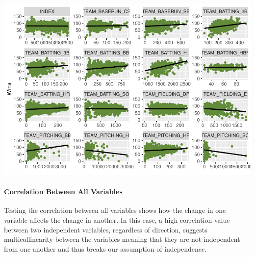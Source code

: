 \documentclass[
]{article}
\newenvironment{Shaded}{\begin{snugshade}}{\end{snugshade}}
\newcommand{\AttributeTok}[1]{\textcolor[rgb]{0.13,0.29,0.53}{#1}}
\newcommand{\ConstantTok}[1]{\textcolor[rgb]{0.56,0.35,0.01}{#1}}
\newcommand{\FunctionTok}[1]{\textcolor[rgb]{0.13,0.29,0.53}{\textbf{#1}}}
\newcommand{\NormalTok}[1]{#1}
\newcommand{\OtherTok}[1]{\textcolor[rgb]{0.56,0.35,0.01}{#1}}
\newcommand{\SpecialCharTok}[1]{\textcolor[rgb]{0.81,0.36,0.00}{\textbf{#1}}}
\newcommand{\StringTok}[1]{\textcolor[rgb]{0.31,0.60,0.02}{#1}}
\begin{document}
\includegraphics{Assignment1_Data621_HW_files/figure-latex/unnamed-chunk-7-1.pdf}

\paragraph{Correlation Between All
Variables}\label{correlation-between-all-variables}

Testing the correlation between all variables shows how the change in
one variable affects the change in another. In this case, a high
correlation value between two independent variables, regardless of
direction, suggests multicollinearity between the variables meaning that
they are not independent from one another and thus breaks our assumption
of independence.

\begin{Shaded}
\end{Shaded}
\end{document}
